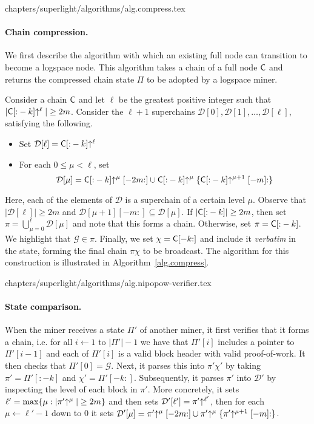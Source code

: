 {chapters/superlight/algorithms/alg.compress.tex}

\paragraph{Chain compression.}
We first describe the algorithm with which an existing full node can transition
to become a logspace node. This algorithm takes a chain of a full node $\mathsf{C}$
and returns the compressed chain state $\Pi$ to be adopted by a logspace
miner.

Consider a chain $\mathsf{C}$ and let $\ell$ be the greatest positive integer such
that $|\mathsf{C}[{:}-k]\negthickspace\uparrow^\ell| \geq 2m$.
Consider the $\ell+1$ superchains
$\mathcal{D}[0],\mathcal{D}[1],\dots,\mathcal{D}[\ell]$, satisfying the following.
\begin{itemize}
	\item
		Set
		$\mathcal{D}[\ell] = \mathsf{C}[{:}-k]\negthickspace\uparrow^\ell$
	\item
		For each $0\leq\mu<\ell$, set
		\[
		\mathcal{D}[\mu] = \mathsf{C}[{:}-k]\negthickspace\uparrow^\mu[-2m{:}] \cup
		\mathsf{C}[{:}-k]\negthickspace\uparrow^\mu\{\mathsf{C}[{:}-k]\negthickspace\uparrow^{\mu+1}[-m]{:}\}
		\]
\end{itemize}

Here, each of the elements of $\mathcal{D}$ is a superchain of a certain level
$\mu$.
Observe that $|\mathcal{D}[\ell]| \geq 2m$ and $\mathcal{D}[\mu+1][-m:] \subseteq
\mathcal{D}[\mu]$. If $|\mathsf{C}[{:}-k]| \geq 2m$, then set $\pi = \bigcup_{\mu=0}^\ell
\mathcal{D}[\mu]$ and note that this forms a chain. Otherwise, set $\pi =
\mathsf{C}[{:}-k]$. We highlight that $\mathcal{G} \in \pi$. Finally, we set $\chi =
\mathsf{C}[-k{:}]$ and include it \emph{verbatim} in the state, forming the final chain
$\pi\chi$ to be broadcast. The algorithm for this construction is illustrated in
Algorithm~\ref{alg.compress}.

{chapters/superlight/algorithms/alg.nipopow-verifier.tex}

\paragraph{State comparison.}
When the miner receives a state $\Pi'$ of another miner, it first verifies that it forms a chain,
i.e. for all $i \gets 1$ to $|\Pi'| - 1$ we have that $\Pi'[i]$ includes a pointer to
$\Pi'[i - 1]$ and each of $\Pi'[i]$ is a valid block header with valid
proof-of-work. It then
checks that $\Pi'[0] = \mathcal{G}$. Next, it parses this into $\pi'\chi'$ by
taking $\pi' = \Pi'[{:}-k]$ and $\chi' = \Pi'[-k{:}]$. Subsequently, it
parses $\pi'$ into $\mathcal{D}'$ by inspecting the level of
each block in $\pi'$. More concretely, it sets
$\ell' = \max\{\mu: |\pi'\negthickspace\uparrow^\mu| \geq 2m\}$ and then
sets $\mathcal{D}'[\ell'] = \pi'\negthickspace\uparrow^{\ell'}$, then for each $\mu \gets \ell' - 1$ down
to $0$ it sets
$\mathcal{D}'[\mu] = \pi'\negthickspace\uparrow^\mu[-2m{:}]
          \cup \pi'\negthickspace\uparrow^\mu\{\pi'\negthickspace\uparrow^{\mu+1}[-m]{:}\}$.

